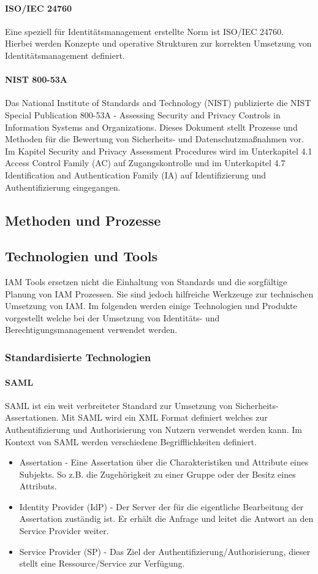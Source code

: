 \documentclass[10pt]{article}
\begin{document}
\paragraph{ISO/IEC 24760}
Eine speziell für Identitätsmanagement erstellte Norm ist ISO/IEC 24760. Hierbei werden Konzepte und operative Strukturen zur korrekten Umsetzung von Identitätsmanagement definiert.~\cite{isoiec24760}
\paragraph{NIST 800-53A}
Das National Institute of Standards and Technology (NIST) publizierte die \glqq{}NIST Special Publication 800-53A - Assessing Security and Privacy Controls in Information Systems and Organizations\grqq{}. Dieses Dokument stellt Prozesse und Methoden für die Bewertung von Sicherheits- und Datenschutzmaßnahmen vor. Im Kapitel \glqq{}Security and Privacy Assessment Procedures\grqq{} wird im Unterkapitel 4.1 \glqq{}Access Control Family (AC)\grqq{} auf Zugangskontrolle und im Unterkapitel 4.7 \glqq{}Identification and Authentication Family (IA)\grqq{} auf Identifizierung und Authentifizierung eingegangen.
\subsection{Methoden und Prozesse}
\subsection{Technologien und Tools}
IAM Tools ersetzen nicht die Einhaltung von Standards und die sorgfältige Planung von IAM Prozessen. Sie sind jedoch hilfreiche Werkzeuge zur technischen Umsetzung von IAM. Im folgenden werden einige Technologien und Produkte vorgestellt welche bei der Umsetzung von Identitäts- und Berechtigungsmanagement verwendet werden.
\subsubsection{Standardisierte Technologien}
\paragraph{SAML}
SAML ist ein weit verbreiteter Standard zur Umsetzung von Sicherheits-Assertationen. Mit SAML wird ein XML Format definiert welches zur Authentifizierung und Authorisierung von Nutzern verwendet werden kann. Im Kontext von SAML werden verschiedene Begrifflichkeiten definiert.
\begin{itemize}
  \item Assertation - Eine Assertation über die Charakteristiken und Attribute eines Subjekts. So z.B. die Zugehörigkeit zu einer Gruppe oder der Besitz eines Attributs.
  \item Identity Provider (IdP) - Der Server der für die eigentliche Bearbeitung der Assertation zuständig ist. Er erhält die Anfrage und leitet die Antwort an den Service Provider weiter.
  \item Service Provider (SP) - Das Ziel der Authentifizierung/Authorisierung, dieser stellt eine Ressource/Service zur Verfügung.
\end{itemize}
~\cite{hughes2005security}
\end{document}
